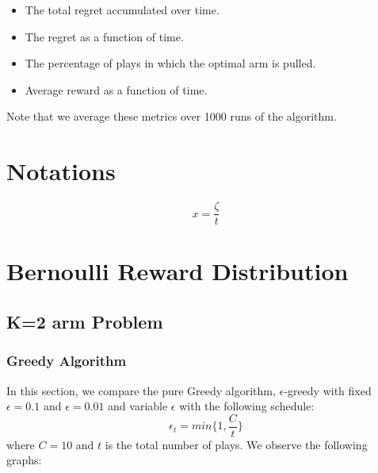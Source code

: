 \documentclass{article}
\begin{document}
	\begin{itemize}
		\item The total regret accumulated over time.
		\item The regret as a function of time.
		\item The percentage of plays in which the optimal arm is pulled.
		\item Average reward as a function of time.
	\end{itemize}
	
	Note that we average these metrics over 1000 runs of the algorithm. 
	
\section{Notations}
\begin{equation}
	x = \frac{\zeta}{t}
\label{default_schedule}
\end{equation}
\section{Bernoulli Reward Distribution}
	\subsection{K=2 arm Problem}
		\subsubsection{Greedy Algorithm}
		
		In this section, we compare the pure Greedy algorithm, $\epsilon$-greedy with fixed $\epsilon=0.1$ and $\epsilon=0.01$ and variable $\epsilon$ with the 
		following schedule:
		\begin{equation}
			\epsilon_{t} = min\{1, \frac{C}{t}\}
		\label{epsilon_greedy_schedule}
		\end{equation}
		where $C=10$ and $t$ is the total number of plays. We observe the following graphs:
		
\end{document}
